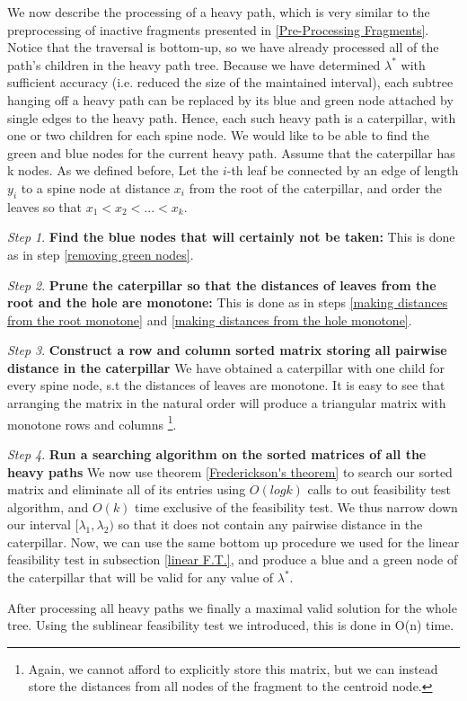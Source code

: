 \documentclass[11pt,a4paper]{article}
\theoremstyle{definition}
\theoremstyle{remark}
\newtheorem{step}{Step}[section]
\begin{document}
We now describe the processing of a heavy path, which is very similar to the preprocessing of inactive fragments presented in \ref{Pre-Processing Fragments}. Notice that the traversal is bottom-up, so we have already processed all of the path's children in the heavy path tree. Because we have determined $\lambda^*$ with sufficient accuracy (i.e. reduced the size of the maintained interval), each subtree hanging off a heavy path can be replaced by its blue and green node attached by single edges to the heavy path. Hence, each such heavy path is a caterpillar, with one or two children for each spine node. We would like to be able to find the green and blue nodes for the current heavy path. %
Assume that the caterpillar has k nodes. As we defined before, Let the $i$-th leaf be connected by an edge of length $y_i$ to a spine node at distance $x_i$ from the root of the caterpillar, and order the leaves so that $x_1 < x_2 < ... < x_k$.

\begin{step}
\textbf{Find the blue nodes that will certainly not be taken:}
This is done as in step \ref{removing green nodes}.
\end{step}
\begin{step}
\textbf{Prune the caterpillar so that the distances of leaves from the root and the hole are monotone:}
This is done as in steps \ref{making distances from the root monotone} and \ref{making distances from the hole monotone}.
\end{step}
\begin{step}
\textbf{Construct a row and column sorted matrix storing all pairwise distance in the caterpillar}
We have obtained a caterpillar with one child for every spine node, s.t the distances of leaves are monotone. It is easy to see that arranging the matrix in the natural order will produce a triangular matrix with monotone rows and columns \footnote{Again, we cannot afford to explicitly store this matrix, but we can instead store the distances from all nodes of the fragment to the centroid node.}. %
\end{step}
\begin{step}
\textbf{Run a searching algorithm on the sorted matrices of all the heavy paths}
We now use theorem \ref{Frederickson's theorem} to search our sorted matrix and eliminate all of its entries using $O(logk)$ calls to out feasibility test algorithm, and $O(k)$ time exclusive of the feasibility test. We thus narrow down our interval $[\lambda_1,\lambda_2)$ so that it does not contain any pairwise distance in the caterpillar. Now, we can use the same bottom up procedure we used for the linear feasibility test in subsection \ref{linear F.T.}, and produce a blue and a green node of the caterpillar that will be valid for any value of $\lambda^*$.  
\end{step}
After processing all heavy paths we finally a maximal valid solution for the whole tree. Using the sublinear feasibility test we introduced, this is done in O(n) time.
\end{document}
